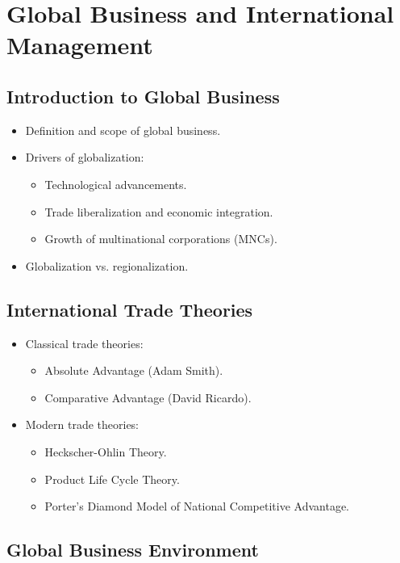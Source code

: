 \chapter{Global Business and International Management}

\section{Introduction to Global Business}
\begin{itemize}
    \item Definition and scope of global business.
    \item Drivers of globalization:
    \begin{itemize}
        \item Technological advancements.
        \item Trade liberalization and economic integration.
        \item Growth of multinational corporations (MNCs).
    \end{itemize}
    \item Globalization vs. regionalization.
\end{itemize}

\section{International Trade Theories}
\begin{itemize}
    \item Classical trade theories:
    \begin{itemize}
        \item Absolute Advantage (Adam Smith).
        \item Comparative Advantage (David Ricardo).
    \end{itemize}
    \item Modern trade theories:
    \begin{itemize}
        \item Heckscher-Ohlin Theory.
        \item Product Life Cycle Theory.
        \item Porter’s Diamond Model of National Competitive Advantage.
    \end{itemize}
\end{itemize}

\section{Global Business Environment}
